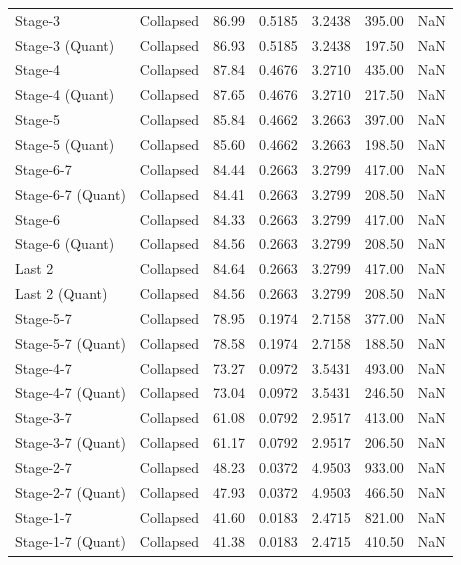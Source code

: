 \begin{table}
\begin{tabular}{llrrrrl}
Stage-3 & Collapsed & 86.99 & 0.5185 & 3.2438 & 395.00 & NaN \\
Stage-3
(Quant) & Collapsed & 86.93 & 0.5185 & 3.2438 & 197.50 & NaN \\
Stage-4 & Collapsed & 87.84 & 0.4676 & 3.2710 & 435.00 & NaN \\
Stage-4
(Quant) & Collapsed & 87.65 & 0.4676 & 3.2710 & 217.50 & NaN \\
Stage-5 & Collapsed & 85.84 & 0.4662 & 3.2663 & 397.00 & NaN \\
Stage-5
(Quant) & Collapsed & 85.60 & 0.4662 & 3.2663 & 198.50 & NaN \\
Stage-6-7 & Collapsed & 84.44 & 0.2663 & 3.2799 & 417.00 & NaN \\
Stage-6-7
(Quant) & Collapsed & 84.41 & 0.2663 & 3.2799 & 208.50 & NaN \\
Stage-6 & Collapsed & 84.33 & 0.2663 & 3.2799 & 417.00 & NaN \\
Stage-6
(Quant) & Collapsed & 84.56 & 0.2663 & 3.2799 & 208.50 & NaN \\
Last 2 & Collapsed & 84.64 & 0.2663 & 3.2799 & 417.00 & NaN \\
Last 2
(Quant) & Collapsed & 84.56 & 0.2663 & 3.2799 & 208.50 & NaN \\
Stage-5-7 & Collapsed & 78.95 & 0.1974 & 2.7158 & 377.00 & NaN \\
Stage-5-7
(Quant) & Collapsed & 78.58 & 0.1974 & 2.7158 & 188.50 & NaN \\
Stage-4-7 & Collapsed & 73.27 & 0.0972 & 3.5431 & 493.00 & NaN \\
Stage-4-7
(Quant) & Collapsed & 73.04 & 0.0972 & 3.5431 & 246.50 & NaN \\
Stage-3-7 & Collapsed & 61.08 & 0.0792 & 2.9517 & 413.00 & NaN \\
Stage-3-7
(Quant) & Collapsed & 61.17 & 0.0792 & 2.9517 & 206.50 & NaN \\
Stage-2-7 & Collapsed & 48.23 & 0.0372 & 4.9503 & 933.00 & NaN \\
Stage-2-7
(Quant) & Collapsed & 47.93 & 0.0372 & 4.9503 & 466.50 & NaN \\
Stage-1-7 & Collapsed & 41.60 & 0.0183 & 2.4715 & 821.00 & NaN \\
Stage-1-7
(Quant) & Collapsed & 41.38 & 0.0183 & 2.4715 & 410.50 & NaN \\
\bottomrule
\end{tabular}
\end{table}
